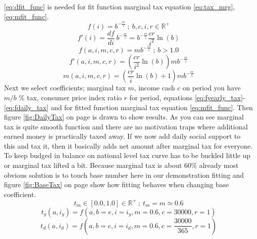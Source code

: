 \ref{eq:dfit_func} is needed for fit function marginal tax equation
\ref{eq:tax_mrg}, \ref{eq:mfit_func}.
\begin{equation} \label{eq:fit_simp}
 f(i) = b^{-\frac{cr}i} ~;~ b,c,i,r \in \mathbb{R}^+
\end{equation}
\begin{equation} \label{eq:fit_deri}
 f'(i) = \frac{df}{di}~b^{-\frac{cr}i} = b^{-\frac{cr}i} \frac{cr}{i^2}\ln(b) 
\end{equation}
\begin{equation} \label{eq:fit_func}
 f(a,i,m,c,r) = m b^{-\frac{cr}i} ~;~ b > 1.0
\end{equation}
\begin{equation} \label{eq:dfit_func}
 f'(a,i,m,c,r) = \left(\frac{cr}{i^2}\ln(b)\right) m b^{-\frac{cr}i}
\end{equation}
\begin{equation} \label{eq:mfit_func}
 m(a,i,m,c,r) = \left(\frac{cr}i\ln(b)+1\right) m b^{-\frac{cr}i}
\end{equation}
Next we select coefficients; marginal tax $m$, income cash $c$ on period you
have $m/b$ \% tax, consumer price index ratio $r$ for period, equations
\ref{eq:fyearly_tax}-\ref{eq:fdaily_tax} and for fitted function marginal tax
equation \ref{eq:mfit_func}. Then figure \ref{fig:DailyTax} on page
\pageref{fig:DailyTax} is drawn to show results. As you can see marginal tax
is quite smooth function and there are no motivation traps where additional
earned money is practically taxed away. If we now add daily social support to
this and tax it, then it basically adds net amount after marginal tax for
everyone. To keep budged in balance on national level tax curve has to be
buckled little up or marginal tax lifted a bit. Because marginal tax is about
60\% already most obvious solution is to touch base number here in our
demonstration fitting and figure \ref{fig:BaseTax} on page
\pageref{fig:BaseTax} show how fitting behaves when changing base coefficient.
\begin{equation} \label{eq:tax_max}
t_m \in [0.0,1.0] \in \mathbb{R}^+ ~;~ t_m = m \simeq 0.6
\end{equation}
\begin{equation} \label{eq:fyearly_tax}
t_y(a,i_y)=f(a,b=e,i=i_y,m=0.6,c=30000,r=1)
\end{equation}
\begin{equation} \label{eq:fdaily_tax}
t_d(a,i_d)=f(a,b=e,i=i_d,m=0.6,c=\frac{30000}{365},r=1)
\end{equation}
